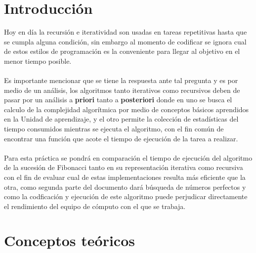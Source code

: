 \documentclass[12pt,twoside]{article}
\begin{document}
\section{Introducci\'on}
Hoy en d\'ia la recursi\'on e iteratividad son usadas en tareas repetitivas hasta que se cumpla alguna condici\'on, sin embargo al momento de codificar se ignora cual de estos estilos de programaci\'on es la conveniente para llegar al objetivo en el menor tiempo posible.\\\\
Es importante mencionar que se tiene la respuesta ante tal pregunta y es por medio de un an\'alisis, los algoritmos tanto iterativos como recursivos deben de pasar por un an\'alisis a \textbf{priori} tanto a \textbf{posteriori} donde en uno se busca el calculo de la complejidad algor\'itmica por medio de conceptos b\'asicos aprendidos en la Unidad de aprendizaje, y el otro permite la colecci\'on de estad\'isticas del tiempo consumidos mientras se ejecuta el algoritmo, con el fin común de encontrar una funci\'on que acote el tiempo de ejecuci\'on de la tarea a realizar.\\\\
Para esta práctica se pondr\'a en comparaci\'on el tiempo de ejecuci\'on del algoritmo de la sucesi\'on de Fibonacci tanto en su representaci\'on iterativa como recursiva con el fin de evaluar cual de estas implementaciones resulta m\'as eficiente que la otra, como segunda parte del documento dar\'a b\'usqueda de n\'umeros perfectos y como la codficaci\'on y ejecuci\'on de este algoritmo puede perjudicar directamente el rendimiento del equipo de c\'omputo con el que se trabaja. 
\section{Conceptos te\'oricos}
\end{document}
